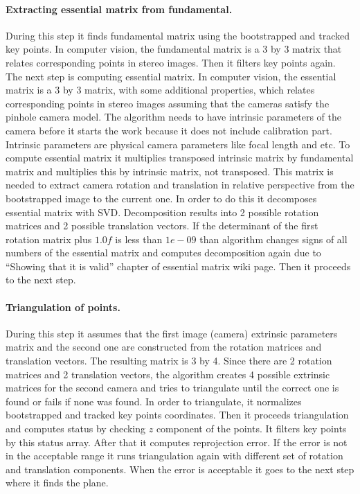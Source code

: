 \documentclass[../../main]{subfiles}
\begin{document}
\paragraph*{Extracting essential matrix from fundamental.}

During this step it finds fundamental matrix using the bootstrapped and tracked key points. In computer vision, the fundamental matrix is a 3 by 3 matrix that relates corresponding points in stereo images. Then it filters key points again. The next step is computing essential matrix. In computer vision, the essential matrix is a 3 by 3 matrix, with some additional properties, which relates corresponding points in stereo images assuming that the cameras satisfy the pinhole camera model. The algorithm needs to have intrinsic parameters of the camera before it starts the work because it does not include calibration part. Intrinsic parameters are physical camera parameters like focal length and etc. To compute essential matrix it multiplies transposed intrinsic matrix by fundamental matrix and multiplies this by intrinsic matrix, not transposed. This matrix is needed to extract camera rotation and translation in relative perspective from the bootstrapped image to the current one. In order to do this it decomposes essential matrix with \ac{SVD}. Decomposition results into 2 possible rotation matrices and 2 possible translation vectors. If the determinant of the first rotation matrix plus $1.0f$ is less than $1e-09$ than algorithm changes signs of all numbers of the essential matrix and computes decomposition again due to “Showing that it is valid” chapter of essential matrix wiki page. Then it proceeds to the next step.

\paragraph*{Triangulation of points.}

During this step it assumes that the first image (camera) extrinsic parameters matrix and the second one are constructed from the rotation matrices and translation vectors. The resulting matrix is 3 by 4. Since there are 2 rotation matrices and 2 translation vectors, the algorithm creates 4 possible extrinsic matrices for the second camera and tries to triangulate until the correct one is found or fails if none was found. In order to triangulate, it normalizes bootstrapped and tracked key points coordinates. Then it proceeds triangulation and computes status by checking $z$ component of the points. It filters key points by this status array. After that it computes reprojection error. If the error is not in the acceptable range it runs triangulation again with different set of rotation and translation components. When the error is acceptable it goes to the next step where it finds the plane.
\end{document}
